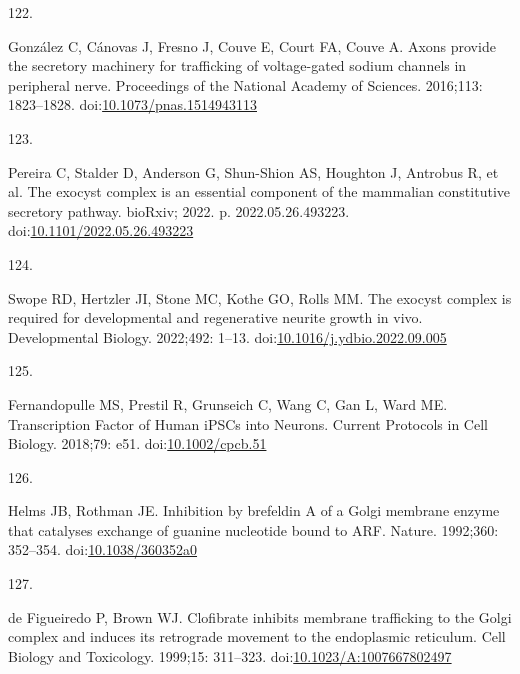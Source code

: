 \documentclass[
  12pt,
  a4paper,
]{book}
\newlength{\cslhangindent}
\newlength{\csllabelwidth}
\newlength{\cslentryspacingunit} %
\newenvironment{CSLReferences}[2] %
 {%
  \setlength{\parindent}{0pt}
  \ifodd #1
  \let\oldpar\par
  \def\par{\hangindent=\cslhangindent\oldpar}
  \fi
  \setlength{\parskip}{#2\cslentryspacingunit}
 }%
 {}
\newcommand{\CSLLeftMargin}[1]{\parbox[t]{\csllabelwidth}{#1}}
\newcommand{\CSLRightInline}[1]{\parbox[t]{\linewidth - \csllabelwidth}{#1}\break}
\begin{document}
\begin{CSLReferences}{0}{0}
\leavevmode{}%
\CSLLeftMargin{122. }%
\CSLRightInline{González C, Cánovas J, Fresno J, Couve E, Court FA, Couve A. Axons provide the secretory machinery for trafficking of voltage-gated sodium channels in peripheral nerve. Proceedings of the National Academy of Sciences. 2016;113: 1823--1828. doi:\href{https://doi.org/10.1073/pnas.1514943113}{10.1073/pnas.1514943113}}

\leavevmode{}%
\CSLLeftMargin{123. }%
\CSLRightInline{Pereira C, Stalder D, Anderson G, Shun-Shion AS, Houghton J, Antrobus R, et al. The exocyst complex is an essential component of the mammalian constitutive secretory pathway. {bioRxiv}; 2022. p. 2022.05.26.493223. doi:\href{https://doi.org/10.1101/2022.05.26.493223}{10.1101/2022.05.26.493223}}

\leavevmode{}%
\CSLLeftMargin{124. }%
\CSLRightInline{Swope RD, Hertzler JI, Stone MC, Kothe GO, Rolls MM. The exocyst complex is required for developmental and regenerative neurite growth in vivo. Developmental Biology. 2022;492: 1--13. doi:\href{https://doi.org/10.1016/j.ydbio.2022.09.005}{10.1016/j.ydbio.2022.09.005}}

\leavevmode{}%
\CSLLeftMargin{125. }%
\CSLRightInline{Fernandopulle MS, Prestil R, Grunseich C, Wang C, Gan L, Ward ME. Transcription {Factor}\textendash{{Mediated Differentiation}} of {Human iPSCs} into {Neurons}. Current Protocols in Cell Biology. 2018;79: e51. doi:\href{https://doi.org/10.1002/cpcb.51}{10.1002/cpcb.51}}

\leavevmode{}%
\CSLLeftMargin{126. }%
\CSLRightInline{Helms JB, Rothman JE. Inhibition by brefeldin {A} of a {Golgi} membrane enzyme that catalyses exchange of guanine nucleotide bound to {ARF}. Nature. 1992;360: 352--354. doi:\href{https://doi.org/10.1038/360352a0}{10.1038/360352a0}}

\leavevmode{}%
\CSLLeftMargin{127. }%
\CSLRightInline{de Figueiredo P, Brown WJ. Clofibrate inhibits membrane trafficking to the {Golgi} complex and induces its retrograde movement to the endoplasmic reticulum. Cell Biology and Toxicology. 1999;15: 311--323. doi:\href{https://doi.org/10.1023/A:1007667802497}{10.1023/A:1007667802497}}


\end{CSLReferences}
\end{document}
